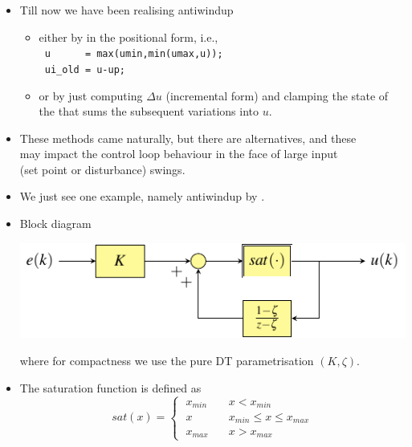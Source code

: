 \begin{frame}[fragile]
\framesubtitleTC{}
\myPause
 \begin{itemize}[<+-| alert@+>]
 \item Till now we have been realising antiwindup
       \begin{itemize}[<+-| alert@+>]
       \item either by  in the positional form, i.e.,\\
             \verb£ u      = max(umin,min(umax,u));£\\
             \verb£ ui_old = u-up;                 £
       \item or by just computing $\Delta u$ (incremental form) and clamping the state of\\
             the  that sums the subsequent variations into $u$. 
       \end{itemize}
  \item \vspace{2mm} These methods came naturally, but there are alternatives, and these\\
        may impact the control loop behaviour in the face of large input\\
        (set point or disturbance) swings.
  \item We just see one example, namely antiwindup by . %
  \end{itemize}
\end{frame}

\begin{frame}
\myPause
 \begin{itemize}[<+-| alert@+>]
  \item Block diagram
        \begin{center}
         \includegraphics[width=0.60\columnwidth]{./Unit-07/img/PI-AW-intFB.pdf}
        \end{center}
        where for compactness we use the pure DT parametrisation $(K,\zeta)$.
  \item The saturation function is defined as
        \begin{displaymath}
         sat(x) = \begin{cases}
                   \; x_{min} & \quad x < x_{min} \\
                   \; x       & \quad x_{min} \leq x \leq x_{max} \\
                   \; x_{max} & \quad x > x_{max}
                  \end{cases}
        \end{displaymath}
  \end{itemize}
\end{frame}

